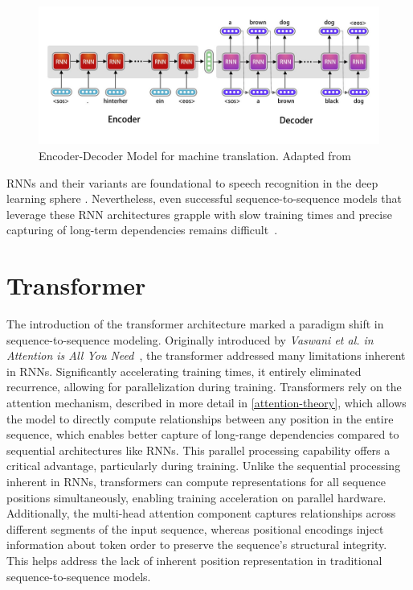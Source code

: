 \begin{figure}[h!]
    \centering
    \includegraphics[width=\textwidth]{obrazky-figures/rnn}
    \caption{Encoder-Decoder Model for machine translation. Adapted from \cite{rnn}}
    \label{pic:rnn}
\end{figure}


RNNs and their variants are foundational to speech recognition in the deep learning sphere \cite{Mehrish_2023}. Nevertheless, even successful sequence-to-sequence models that leverage these RNN architectures grapple with slow training times and precise capturing of long-term dependencies remains difficult~\cite{Goodfellow-et-al-2016}.


\section{Transformer}
The introduction of the transformer architecture marked a paradigm shift in sequence-to-sequence modeling. Originally introduced by \textit{Vaswani et al. in Attention is All You Need}~\cite{vaswani2017attention}, the transformer addressed many limitations inherent in RNNs. Significantly accelerating training times, it entirely eliminated recurrence, allowing for parallelization during training. Transformers rely on the attention mechanism, described in more detail in \ref{attention-theory}, which allows the model to directly compute relationships between any position in the entire sequence, which enables better capture of long-range dependencies compared to sequential architectures like RNNs. This parallel processing capability offers a critical advantage, particularly during training. Unlike the sequential processing inherent in RNNs, transformers can compute representations for all sequence positions simultaneously, enabling training acceleration on parallel hardware. Additionally, the multi-head attention component captures relationships across different segments of the input sequence, whereas positional encodings inject information about token order to preserve the sequence’s structural integrity. This helps address the lack of inherent position representation in traditional sequence-to-sequence models.

